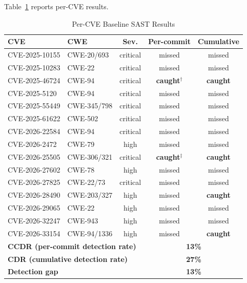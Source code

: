 \documentclass[sigconf,review]{acmart}
\newcommand{\CCDR}{13\%}                %
\newcommand{\CDR}{27\%}                 %
\newcommand{\GAP}{13\%}                 %
\begin{document}
Table~\ref{tab:baseline} reports per-CVE results.

\begin{table}[h]
\footnotesize
\centering
\caption{Per-CVE Baseline SAST Results}
\label{tab:baseline}
\begin{tabular}{l p{2.0cm} c c c}
\toprule
\textbf{CVE} & \textbf{CWE} & \textbf{Sev.} & \textbf{Per-commit} & \textbf{Cumulative} \\
\midrule
CVE-2025-10155 & CWE-20/693  & critical & missed & missed \\
CVE-2025-10283 & CWE-22     & critical & missed & missed \\
CVE-2025-46724 & CWE-94     & critical & \textbf{caught}$^\dagger$ & \textbf{caught} \\
CVE-2025-5120  & CWE-94     & critical & missed & missed \\
CVE-2025-55449 & CWE-345/798 & critical & missed & missed \\
CVE-2025-61622 & CWE-502    & critical & missed & missed \\
CVE-2026-22584 & CWE-94     & critical & missed & missed \\
CVE-2026-2472  & CWE-79     & high     & missed & missed \\
CVE-2026-25505 & CWE-306/321 & critical & \textbf{caught}$^\ddagger$ & \textbf{caught} \\
CVE-2026-27602 & CWE-78     & high     & missed & missed \\
CVE-2026-27825 & CWE-22/73  & critical & missed & missed \\
CVE-2026-28490 & CWE-203/327 & high    & missed & \textbf{caught} \\
CVE-2026-29065 & CWE-22     & high     & missed & missed \\
CVE-2026-32247 & CWE-943    & high     & missed & missed \\
CVE-2026-33154 & CWE-94/1336 & high    & missed & \textbf{caught} \\
\midrule
\multicolumn{3}{l}{\textbf{CCDR (per-commit detection rate)}} & \multicolumn{2}{c}{\textbf{\CCDR{}}} \\
\multicolumn{3}{l}{\textbf{CDR (cumulative detection rate)}}  & \multicolumn{2}{c}{\textbf{\CDR{}}} \\
\multicolumn{3}{l}{\textbf{Detection gap}}                    & \multicolumn{2}{c}{\textbf{\GAP{}}} \\
\bottomrule
\end{tabular}
\end{table}
\end{document}
